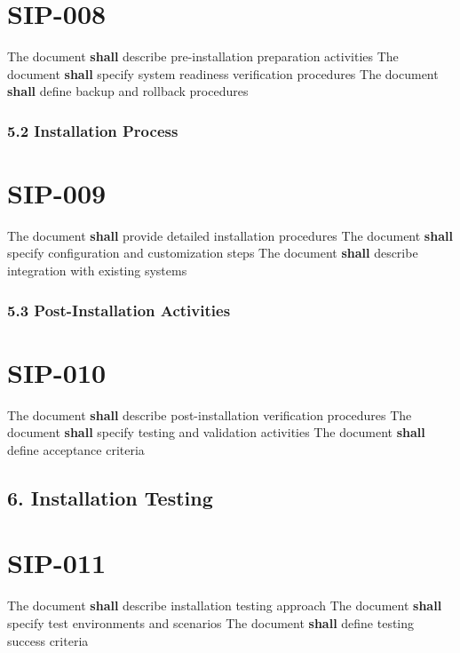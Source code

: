 \section{SIP-008}\label{SIP-008}

The document \textbf{shall} describe pre-installation preparation activities
The document \textbf{shall} specify system readiness verification procedures
The document \textbf{shall} define backup and rollback procedures

\subsubsection{5.2 Installation Process}

\section{SIP-009}\label{SIP-009}

The document \textbf{shall} provide detailed installation procedures
The document \textbf{shall} specify configuration and customization steps
The document \textbf{shall} describe integration with existing systems

\subsubsection{5.3 Post-Installation Activities}

\section{SIP-010}\label{SIP-010}

The document \textbf{shall} describe post-installation verification procedures
The document \textbf{shall} specify testing and validation activities
The document \textbf{shall} define acceptance criteria

\subsection{6. Installation Testing}

\section{SIP-011}\label{SIP-011}

The document \textbf{shall} describe installation testing approach
The document \textbf{shall} specify test environments and scenarios
The document \textbf{shall} define testing success criteria

